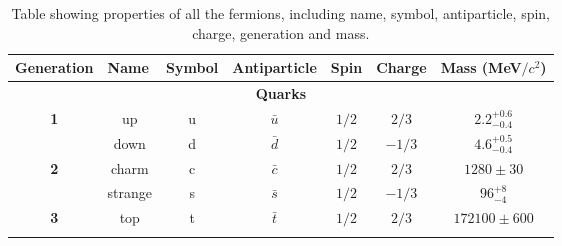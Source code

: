 \begin{table}[h!]
    \caption{Table showing properties of all the fermions, including name, symbol, antiparticle, spin, charge, generation and mass.}
    \label{tab:fermion_table}
    \begin{tabular}{|ccccccc|}
    \hline
    \multicolumn{1}{|l|}{\textbf{Generation}}         & \multicolumn{1}{l|}{\textbf{Name}}     & \multicolumn{1}{l|}{\textbf{Symbol}} & \multicolumn{1}{l|}{\textbf{Antiparticle}} & \multicolumn{1}{l|}{\textbf{Spin}} & \multicolumn{1}{l|}{\textbf{Charge}} & \multicolumn{1}{l|}{\textbf{Mass (MeV$/c^2$)}} \\ \hline
    \multicolumn{7}{|c|}{\textbf{Quarks}}                                                                                                                                                                                                                                                                       \\ \hline
    \multicolumn{1}{|c|}{\multirow{2}{*}{\textbf{1}}}                  & \multicolumn{1}{c|}{up}                & \multicolumn{1}{c|}{u}               & \multicolumn{1}{c|}{$\bar{u}$}             & \multicolumn{1}{c|}{$1/2$} & \multicolumn{1}{c|}{$2/3$}   & $2.2_{-0.4}^{+0.6}$                            \\ \cline{2-7} 
    \multicolumn{1}{|c|}{}                   & \multicolumn{1}{c|}{down}              & \multicolumn{1}{c|}{d}               & \multicolumn{1}{c|}{$\bar{d}$}             & \multicolumn{1}{c|}{$1/2$} & \multicolumn{1}{c|}{$-1/3$}  & $4.6_{-0.4}^{+0.5}$                            \\ \hline
    \multicolumn{1}{|c|}{\multirow{2}{*}{\textbf{2}}} & \multicolumn{1}{c|}{charm}             & \multicolumn{1}{c|}{c}               & \multicolumn{1}{c|}{$\bar{c}$}             & \multicolumn{1}{c|}{$1/2$} & \multicolumn{1}{c|}{$2/3$}   & $1280 \pm 30$                                  \\ \cline{2-7} 
    \multicolumn{1}{|c|}{}                            & \multicolumn{1}{c|}{strange}           & \multicolumn{1}{c|}{s}               & \multicolumn{1}{c|}{$\bar{s}$}             & \multicolumn{1}{c|}{$1/2$} & \multicolumn{1}{c|}{$-1/3$}  & $96_{-4}^{+8}$                                 \\ \hline
    \multicolumn{1}{|c|}{\multirow{2}{*}{\textbf{3}}} & \multicolumn{1}{c|}{top}               & \multicolumn{1}{c|}{t}               & \multicolumn{1}{c|}{$\bar{t}$}             & \multicolumn{1}{c|}{$1/2$} & \multicolumn{1}{c|}{$2/3$}   & $172100 \pm 600$                               \\ \cline{2-7} 

\end{tabular}
\end{table}
